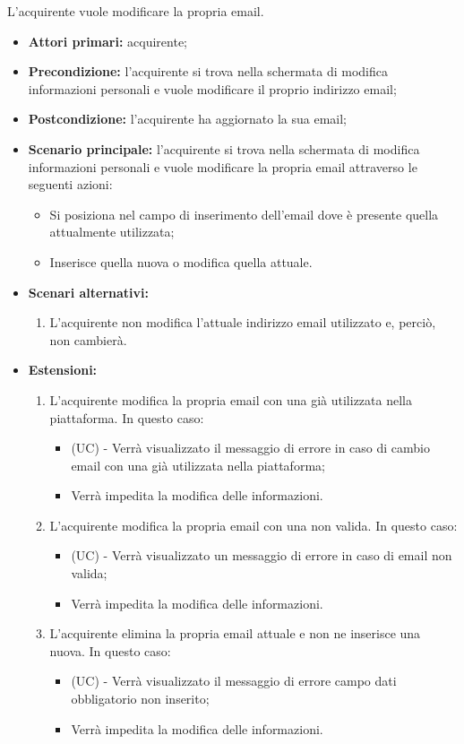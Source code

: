 L'acquirente vuole modificare la propria email.
\begin{itemize}
    \item \textbf{Attori primari:} acquirente;
    \item \textbf{Precondizione:} l'acquirente si trova nella schermata di modifica informazioni personali e vuole modificare il proprio indirizzo email;
    \item \textbf{Postcondizione:} l'acquirente ha aggiornato la sua email;
    \item \textbf{Scenario principale:} l'acquirente si trova nella schermata di modifica informazioni personali e vuole modificare la propria email attraverso le seguenti azioni:
        \begin{itemize}
            \item Si posiziona nel campo di inserimento dell'email dove è presente quella attualmente utilizzata;
            \item Inserisce quella nuova o modifica quella attuale.
        \end{itemize}
    \item \textbf{Scenari alternativi:} 
    \begin{enumerate}[label=\lett]
        \item L'acquirente non modifica l'attuale indirizzo email utilizzato e, perciò, non cambierà.
    \end{enumerate}
    \item \textbf{Estensioni:} 
    \begin{enumerate}[label=\lett]
        \item L'acquirente modifica la propria email con una già utilizzata nella piattaforma. In questo caso:
        \begin{itemize}
            \item (UC) - Verrà visualizzato il messaggio di errore in caso di cambio email con una già utilizzata nella piattaforma;
            \item Verrà impedita la modifica delle informazioni.
        \end{itemize}
        \item L'acquirente modifica la propria email con una non valida. In questo caso:
        \begin{itemize}
            \item (UC) - Verrà visualizzato un messaggio di errore in caso di email non valida;
            \item Verrà impedita la modifica delle informazioni.
        \end{itemize}
        \item L'acquirente elimina la propria email attuale e non ne inserisce una nuova. In questo caso:
        \begin{itemize}
            \item (UC) - Verrà visualizzato il messaggio di errore campo dati obbligatorio non inserito;
            \item Verrà impedita la modifica delle informazioni.
        \end{itemize}
    \end{enumerate}
\end{itemize}


